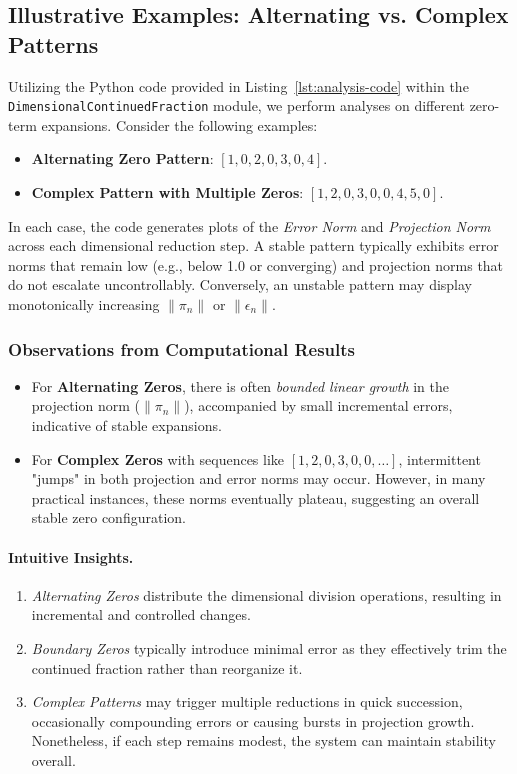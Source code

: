 \subsection{Illustrative Examples: Alternating vs. Complex Patterns}
Utilizing the Python code provided in Listing~\ref{lst:analysis-code} within the \verb|DimensionalContinuedFraction| module, we perform analyses on different zero-term expansions. Consider the following examples:
\begin{itemize}
  \item \textbf{Alternating Zero Pattern}: \([1, 0, 2, 0, 3, 0, 4]\).
  \item \textbf{Complex Pattern with Multiple Zeros}: \([1, 2, 0, 3, 0, 0, 4, 5, 0]\).
\end{itemize}
In each case, the code generates plots of the \emph{Error Norm} and \emph{Projection Norm} across each dimensional reduction step. A stable pattern typically exhibits error norms that remain low (e.g., below 1.0 or converging) and projection norms that do not escalate uncontrollably. Conversely, an unstable pattern may display monotonically increasing \(\|\pi_n\|\) or \(\|\epsilon_n\|\).

\subsubsection{Observations from Computational Results}
\begin{itemize}
  \item For \textbf{Alternating Zeros}, there is often \emph{bounded linear growth} in the projection norm (\(\|\pi_n\|\)), accompanied by small incremental errors, indicative of stable expansions.
  \item For \textbf{Complex Zeros} with sequences like \([1, 2, 0, 3, 0, 0, \dots]\), intermittent "jumps" in both projection and error norms may occur. However, in many practical instances, these norms eventually plateau, suggesting an overall stable zero configuration.
\end{itemize}

\paragraph{Intuitive Insights.}
\begin{enumerate}
  \item \emph{Alternating Zeros} distribute the dimensional division operations, resulting in incremental and controlled changes.
  \item \emph{Boundary Zeros} typically introduce minimal error as they effectively trim the continued fraction rather than reorganize it.
  \item \emph{Complex Patterns} may trigger multiple reductions in quick succession, occasionally compounding errors or causing bursts in projection growth. Nonetheless, if each step remains modest, the system can maintain stability overall.
\end{enumerate}

